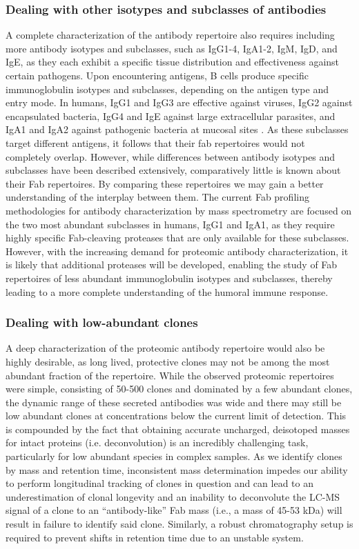 \subsubsection{Dealing with other isotypes and subclasses of antibodies}
A complete characterization of the antibody repertoire also requires including more antibody isotypes and subclasses, such as IgG1-4, IgA1-2, IgM, IgD, and IgE, as they each exhibit a specific tissue distribution and effectiveness against certain pathogens. Upon encountering antigens, B cells produce specific immunoglobulin isotypes and subclasses, depending on the antigen type and entry mode. In humans, IgG1 and IgG3 are effective against viruses, IgG2 against encapsulated bacteria, IgG4 and IgE against large extracellular parasites, and IgA1 and IgA2 against pathogenic bacteria at mucosal sites \cite{vidarsson2014igg, xu2012immunoglobulin}. As these subclasses target different antigens, it follows that their fab repertoires would not completely overlap. However, while differences between antibody isotypes and subclasses have been described extensively, comparatively little is known about their Fab repertoires. By comparing these repertoires we may gain a better understanding of the interplay between them.
The current Fab profiling methodologies for antibody characterization by mass spectrometry are focused on the two most abundant subclasses in humans, IgG1 and IgA1, as they require highly specific Fab-cleaving proteases that are only available for these subclasses. However, with the increasing demand for proteomic antibody characterization, it is likely that additional proteases will be developed, enabling the study of Fab repertoires of less abundant immunoglobulin isotypes and subclasses, thereby leading to a more complete understanding of the humoral immune response.

\subsubsection{Dealing with low-abundant clones}
A deep characterization of the proteomic antibody repertoire would also be highly desirable, as long lived, protective clones may not be among the most abundant fraction of the repertoire. While the observed proteomic repertoires were simple, consisting of 50-500 clones and dominated by a few abundant clones, the dynamic range of these secreted antibodies was wide and there may still be low abundant clones at concentrations below the current limit of detection. This is compounded by the fact that obtaining accurate uncharged, deisotoped masses for intact proteins (i.e. deconvolution) is an incredibly challenging task, particularly for low abundant species in complex samples. As we identify clones by mass and retention time, inconsistent mass determination impedes our ability to perform longitudinal tracking of clones in question and can lead to an underestimation of clonal longevity and an inability to deconvolute the LC-MS signal of a clone to an “antibody-like” Fab mass (i.e., a mass of 45-53 kDa) will result in failure to identify said clone. Similarly, a robust chromatography setup is required to prevent shifts in retention time due to an unstable system.


